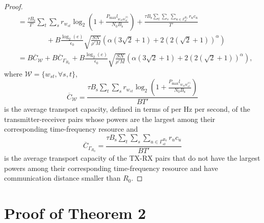 \documentclass[journal,draftclsnofoot,onecolumn,12pt,twoside]{IEEEtran}
\begin{document}
\begin{proof}
\begin{equation}
\begin{aligned}
&=\frac{\tau B_{\text{s}}}{T'}\sum_{t}\sum_{s}r_{w_{st}}\log_2\left(1+\frac{P_{\text{max}}l_{w_{st}w_{st}^{\text{(r)}}}}{N_0B_{\text{s}}}\right)+\frac{\tau B_{\text{s}}\sum_{t}\sum_{s}\sum_{u\in\Gamma^{R_0}_{st}}r_uc_u}{T'}\\
&\qquad\qquad+B\frac{\log_2(e)}{\epsilon_0}\sqrt{\frac{SN}{\rho'M}}\left(\alpha\left(3\sqrt{2}+1\right)+2(2(\sqrt{2}+1))^{\alpha}\right)\\&
=B\overline{C}_{\mathcal{W}}+B\overline{C}_{\Gamma_{R_0}}+B\frac{\log_2(e)}{\epsilon_0}\sqrt{\frac{SN}{\rho'M}}\left(\alpha\left(3\sqrt{2}+1\right)+2(2(\sqrt{2}+1))^{\alpha}\right),
\end{aligned}
\end{equation}
where $\mathcal{W}=\lbrace w_{st},\forall s,t\rbrace$,
\begin{equation}
\overline{C}_{\mathcal{W}}=\frac{\tau B_{\text{s}}\sum_{t}\sum_{s}r_{w_{st}}\log_2\left(1+\frac{P_{\text{max}}l_{w_{st}w_{st}^{\text{(r)}}}}{N_0B_{\text{s}}}\right)}{BT'}
\end{equation}
is the average transport capacity, defined in terms of per Hz per second, of the transmitter-receiver pairs whose powers are the largest among their corresponding time-frequency resource and 
\begin{equation}
\overline{C}_{\Gamma_{R_0}}=\frac{\tau B_{\text{s}}\sum_{t}\sum_{s}\sum_{u\in\Gamma^{R_0}_{st}}r_uc_u}{BT'}
\end{equation}
is the average transport capacity of the TX-RX pairs that do not have the largest powers among their corresponding time-frequency resource and have communication distance smaller than $R_0$.

\end{proof} 

\section{Proof of Theorem 2}

\label{App:ProofThm2}
\end{document}

